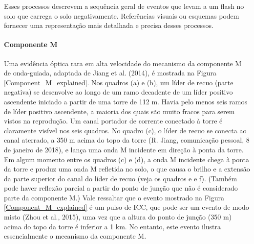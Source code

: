 \documentclass[a4paper, 12pt, onecolumn,singlespacing]{article}
\begin{document}
	Esses processos descrevem a sequência geral de eventos que levam a um flash no solo que carrega o solo negativamente. Referências visuais ou esquemas podem fornecer uma representação mais detalhada e precisa desses processos.
	
	\paragraph{Componente M} Uma evidência óptica rara em alta velocidade do mecanismo da componente M de onda-guiada, adaptada de Jiang et al. (2014), é mostrada na Figura \ref{Component_M_explained}\cite{TRAN_2019}. Nos quadros (a) e (b), um líder de recuo (parte negativa) se desenvolve ao longo de um ramo decadente de um líder positivo ascendente iniciado a partir de uma torre de 112 m. Havia pelo menos seis ramos de líder positivo ascendente, a maioria dos quais são muito fracos para serem vistos na reprodução. Um canal portador de corrente conectado à torre é claramente visível nos seis quadros. No quadro (c), o líder de recuo se conecta ao canal aterrado, a 350 m acima do topo da torre (R. Jiang, comunicação pessoal, 8 de janeiro de 2018), e lança uma onda M incidente em direção à ponta da torre. Em algum momento entre os quadros (c) e (d), a onda M incidente chega à ponta da torre e produz uma onda M refletida no solo, o que causa o brilho e a extensão da parte superior do canal do líder de recuo (veja os quadros e e f). (Também pode haver reflexão parcial a partir do ponto de junção que não é considerado parte da componente M.) Vale ressaltar que o evento mostrado na Figura \ref{Component_M_explained} é um pulso de ICC, que pode ser um evento de modo misto (Zhou et al., 2015), uma vez que a altura do ponto de junção (350 m) acima do topo da torre é inferior a 1 km. No entanto, este evento ilustra essencialmente o mecanismo da componente M.
	
\end{document}
